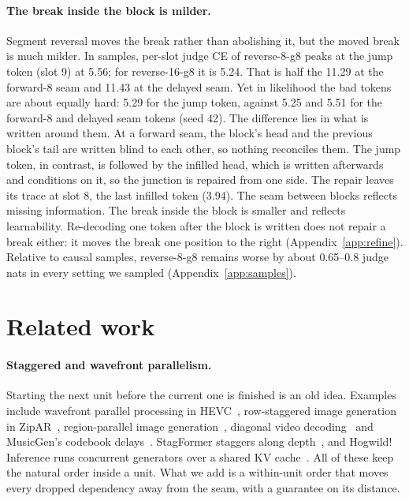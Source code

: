 \documentclass[11pt]{article}
\theoremstyle{definition}
\theoremstyle{remark}
\newcommand{\sch}[1]{\textsf{#1}}
\begin{document}
\paragraph{The break inside the block is milder.}
Segment reversal moves the break rather than abolishing it, but the moved break is much milder.
In samples, per-slot judge CE of \sch{reverse-8-g8} peaks at the jump token (slot 9) at 5.56; for \sch{reverse-16-g8} it is 5.24.
That is half the 11.29 at the \sch{forward-8} seam and 11.43 at the \sch{delayed} seam.
Yet in likelihood the bad tokens are about equally hard: 5.29 for the jump token, against 5.25 and 5.51 for the \sch{forward-8} and \sch{delayed} seam tokens (seed 42).
The difference lies in what is written around them.
At a forward seam, the block's head and the previous block's tail are written blind to each other, so nothing reconciles them.
The jump token, in contrast, is followed by the infilled head, which is written afterwards and conditions on it, so the junction is repaired from one side.
The repair leaves its trace at slot 8, the last infilled token (3.94).
The seam between blocks reflects missing information.
The break inside the block is smaller and reflects learnability.
Re-decoding one token after the block is written does not repair a break either: it moves the break one position to the right (Appendix~\ref{app:refine}).
Relative to causal samples, \sch{reverse-8-g8} remains worse by about 0.65--0.8 judge nats in every setting we sampled (Appendix~\ref{app:samples}).

\section{Related work}
\label{sec:related}

\paragraph{Staggered and wavefront parallelism.}
Starting the next unit before the current one is finished is an old idea.
Examples include wavefront parallel processing in HEVC~\citep{sullivan2012hevc}, row-staggered image generation in ZipAR~\citep{he2025zipar}, region-parallel image generation~\citep{wang2025par}, diagonal video decoding~\citep{ye2025diagonal} and MusicGen's codebook delays~\citep{copet2023musicgen}.
StagFormer staggers along depth~\citep{cutler2025stagformer}, and Hogwild! Inference runs concurrent generators over a shared KV cache~\citep{rodionov2025hogwild}.
All of these keep the natural order inside a unit.
What we add is a within-unit order that moves every dropped dependency away from the seam, with a guarantee on its distance.
\end{document}
